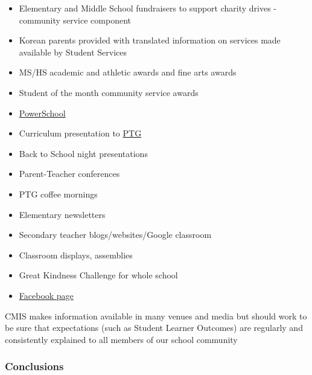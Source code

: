 
\begin{findings}
\begin{itemize}
\item Elementary and Middle School fundraisers to support charity drives - community service component
\item Korean parents provided with translated information on services made available by Student Services 
\item MS/HS academic and athletic awards and fine arts awards
\item Student of the month community service awards 
\item \href{https://cmis.powerschool.com/public/}{PowerSchool}
\item Curriculum presentation to \href{http://blogs.cmis.ac.th/ptg/}{PTG}
\item Back to School night presentations
\item Parent-Teacher conferences 
\item PTG coffee mornings
\item Elementary newsletters
\item Secondary teacher blogs/websites/Google classroom
\item Classroom displays, assemblies
\item Great Kindness Challenge for whole school
\item \href{https://www.facebook.com/cmis.th/}{Facebook page}
\end{itemize}


CMIS makes information available in many venues and media but should work to be sure that expectations (such as Student Learner Outcomes) are regularly and consistently explained to all members of our school community
\end{findings}

\subsubsection{Conclusions}

